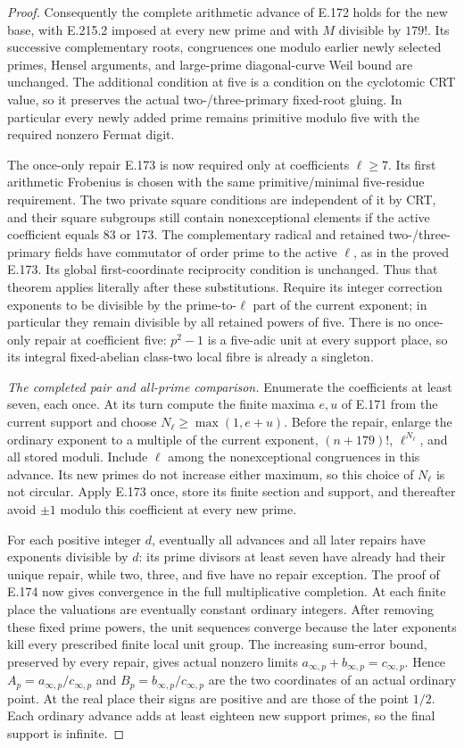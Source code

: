 \begin{proof}
Consequently the complete arithmetic advance of E.172 holds for the
new base, with E.215.2 imposed at every new prime and with
$M$ divisible by $179!$. Its successive complementary roots, congruences
one modulo earlier newly selected primes, Hensel arguments, and
large-prime diagonal-curve Weil bound are unchanged. The additional
condition at five is a condition on the cyclotomic CRT value, so it
preserves the actual two-/three-primary fixed-root gluing. In particular
every newly added prime remains primitive modulo five with the required
nonzero Fermat digit.

The once-only repair E.173 is now required only at coefficients
$\ell\ge7$. Its first arithmetic Frobenius is chosen with the same
primitive/minimal five-residue requirement. The two private square
conditions are independent of it by CRT, and their square subgroups
still contain nonexceptional elements if the active coefficient equals
83 or 173. The complementary radical and retained two-/three-primary
fields have commutator of order prime to the active $\ell$, as in the
proved E.173. Its global first-coordinate reciprocity condition is
unchanged. Thus that theorem applies literally after these substitutions.
Require its integer correction exponents to be divisible by the
prime-to-$\ell$ part of the current exponent; in particular they remain
divisible by all retained powers of five. There is no once-only repair
at coefficient five: $p^2-1$ is a five-adic unit at every support place,
so its integral fixed-abelian class-two local fibre is already a singleton.

\emph{The completed pair and all-prime comparison.}
Enumerate the coefficients at least seven, each once. At its turn compute
the finite maxima $e,u$ of E.171 from the current support and choose
$N_\ell\ge\max(1,e+u)$. Before the repair, enlarge the ordinary exponent
to a multiple of the current exponent, $(n+179)!$, $\ell^{N_\ell}$,
and all stored moduli. Include $\ell$ among the nonexceptional congruences
in this advance. Its new primes do not increase either maximum, so
this choice of $N_\ell$ is not circular. Apply E.173 once, store its
finite section and support, and thereafter avoid $\pm1$ modulo this
coefficient at every new prime.

For each positive integer $d$, eventually all advances and all later
repairs have exponents divisible by $d$: its prime divisors at least
seven have already had their unique repair, while two, three, and five
have no repair exception. The proof of E.174 now gives convergence in
the full multiplicative completion. At each finite place the valuations
are eventually constant ordinary integers. After removing these fixed
prime powers, the unit sequences converge because the later exponents
kill every prescribed finite local unit group. The increasing sum-error
bound, preserved by every repair, gives actual nonzero limits
$a_{\infty,p}+b_{\infty,p}=c_{\infty,p}$. Hence
$A_p=a_{\infty,p}/c_{\infty,p}$ and
$B_p=b_{\infty,p}/c_{\infty,p}$ are the two coordinates of an actual
ordinary point. At the real place their signs are positive and are those
of the point $1/2$. Each ordinary advance adds at least eighteen new
support primes, so the final support is infinite.


\end{proof}
